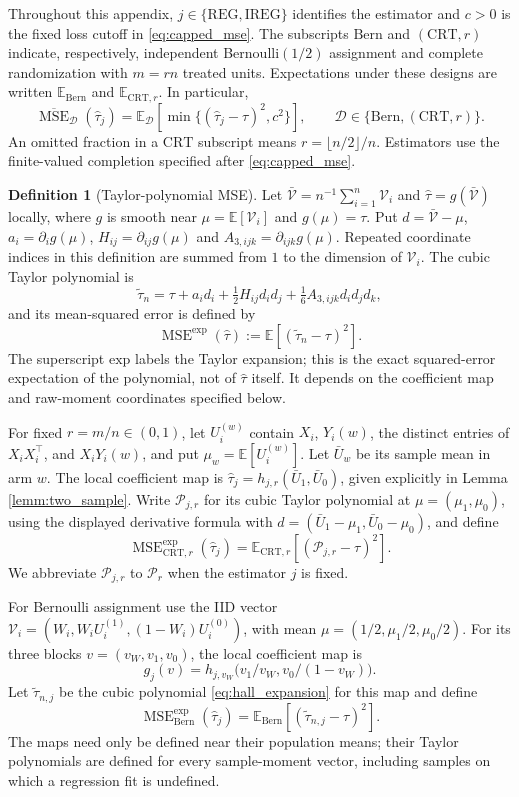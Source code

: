 \documentclass{article}
\newcommand{\EEE}{\mathbb{E}}
\newcommand{\htau}{\hat{\tau}}
\DeclareMathOperator{\MSE}{MSE}
\newcommand{\Bern}{\mathrm{Bern}}
\newcommand{\CRT}{\mathrm{CRT}}
\newcommand{\IREG}{\mathrm{IREG}}
\newcommand{\REG}{\mathrm{REG}}
\newcommand{\MSEexp}{\MSE^{\mathrm{exp}}}
\theoremstyle{plain}
\theoremstyle{definition}
\newtheorem{defi}[exam]{Definition}
\theoremstyle{remark}
\begin{document}
Throughout this appendix, $j\in\{\REG,\IREG\}$ identifies the
estimator and $c>0$ is the fixed loss cutoff in \eqref{eq:capped_mse}.
The subscripts $\Bern$ and $(\CRT,r)$ indicate, respectively,
independent Bernoulli$(1/2)$ assignment and complete randomization
with $m=rn$ treated units. Expectations under these designs are
written $\EEE_\Bern$ and $\EEE_{\CRT,r}$. In particular,
\[
\overline{\operatorname{MSE}}_{\mathcal D}(\htau_j)
=\EEE_{\mathcal D}[\min\{(\htau_j-\tau)^2,c^2\}],
\qquad \mathcal D\in\{\Bern,(\CRT,r)\}.
\]
An omitted fraction in a $\CRT$ subscript means
$r=\lfloor n/2\rfloor/n$. Estimators use the finite-valued
completion specified after \eqref{eq:capped_mse}.

\begin{defi}[Taylor-polynomial MSE]
\label{def:msexp}
Let $\bar{\mathcal V}=n^{-1}\sum_{i=1}^n\mathcal V_i$ and
$\hat\tau=g(\bar{\mathcal V})$ locally, where $g$ is smooth
near $\mu=\EEE[\mathcal V_i]$ and $g(\mu)=\tau$. Put
$d=\bar{\mathcal V}-\mu$, $a_i=\partial_i g(\mu)$,
$H_{ij}=\partial_{ij}g(\mu)$ and
$A_{3,ijk}=\partial_{ijk}g(\mu)$. Repeated coordinate indices in
this definition are summed from $1$ to the dimension of $\mathcal V_i$.
The cubic Taylor polynomial is
\begin{equation}
\label{eq:hall_expansion}
\tilde\tau_n
=\tau+a_i d_i+\tfrac12H_{ij}d_i d_j
+\tfrac16A_{3,ijk}d_i d_j d_k,
\end{equation}
and its mean-squared error is defined by
\[
\MSEexp(\hat\tau):=\EEE[(\tilde\tau_n-\tau)^2].
\]
The superscript $\mathrm{exp}$ labels the Taylor expansion; this is
the exact squared-error expectation of the polynomial, not of
$\hat\tau$ itself. It depends on the coefficient map and raw-moment
coordinates specified below.

For fixed $r=m/n\in(0,1)$, let $U_i^{(w)}$ contain $X_i$, $Y_i(w)$,
the distinct entries of $X_iX_i^\top$, and $X_iY_i(w)$, and put
$\mu_w=\EEE[U_i^{(w)}]$. Let $\bar U_w$ be its sample mean in
arm $w$. The local coefficient map is
$\hat\tau_j=h_{j,r}(\bar U_1,\bar U_0)$, given explicitly in
Lemma \ref{lemm:two_sample}. Write $\mathcal P_{j,r}$ for its
cubic Taylor polynomial at $\mu=(\mu_1,\mu_0)$, using the displayed
derivative formula with $d=(\bar U_1-\mu_1,\bar U_0-\mu_0)$, and define
\[
\MSEexp_{\CRT,r}(\hat\tau_j)
=\EEE_{\CRT,r}[(\mathcal P_{j,r}-\tau)^2].
\]
We abbreviate $\mathcal P_{j,r}$ to $\mathcal P_r$ when the
estimator $j$ is fixed.

For Bernoulli assignment use the IID vector
$\mathcal V_i=(W_i,W_iU_i^{(1)},(1-W_i)U_i^{(0)})$, with mean
$\mu=(1/2,\mu_1/2,\mu_0/2)$. For its three blocks $v=(v_W,v_1,v_0)$,
the local coefficient map is
\[
g_j(v)=h_{j,v_W}\big(v_1/v_W,v_0/(1-v_W)\big).
\]
Let $\tilde\tau_{n,j}$ be the cubic polynomial
\eqref{eq:hall_expansion} for this map and define
\[
\MSEexp_\Bern(\hat\tau_j)
=\EEE_\Bern[(\tilde\tau_{n,j}-\tau)^2].
\]
The maps need only be defined near their population means; their
Taylor polynomials are defined for every sample-moment vector,
including samples on which a regression fit is undefined.
\end{defi}
\end{document}

